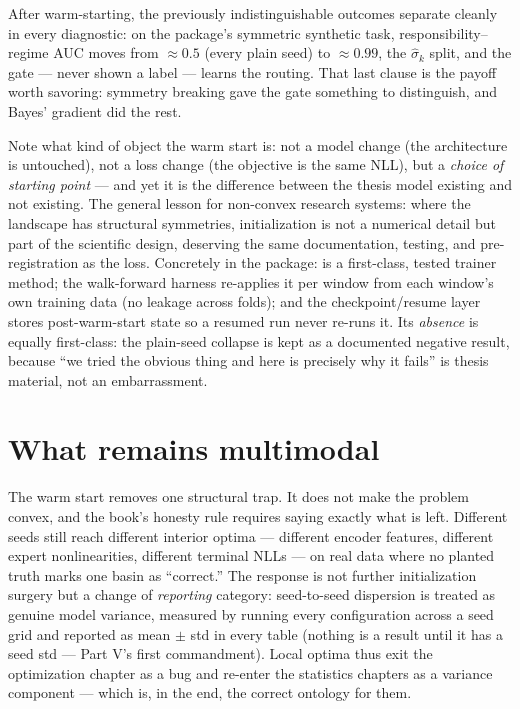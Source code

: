 After warm-starting, the previously indistinguishable outcomes separate
cleanly in every diagnostic: on the package's symmetric synthetic task,
responsibility--regime AUC moves from $\approx 0.5$ (every plain seed)
to $\approx 0.99$, the $\hat\sigma_k$ split, and the gate --- never
shown a label --- learns the routing. That last clause is the payoff
worth savoring: symmetry breaking gave the gate something to
distinguish, and Bayes' gradient did the rest.

\begin{engineering}
Note what kind of object the warm start is: not a model change (the
architecture is untouched), not a loss change (the objective is the
same NLL), but a \emph{choice of starting point} --- and yet it is the
difference between the thesis model existing and not existing. The
general lesson for non-convex research systems: where the landscape has
structural symmetries, initialization is not a numerical detail but
part of the scientific design, deserving the same documentation,
testing, and pre-registration as the loss. Concretely in the package:
 is a first-class, tested trainer method; the
walk-forward harness re-applies it per window from each window's own
training data (no leakage across folds); and the checkpoint/resume
layer stores post-warm-start state so a resumed run never re-runs it.
Its \emph{absence} is equally first-class: the plain-seed collapse is
kept as a documented negative result, because ``we tried the obvious
thing and here is precisely why it fails'' is thesis material, not an
embarrassment.
\end{engineering}

\section{What remains multimodal}\label{sec:remains}

The warm start removes one structural trap. It does not make the
problem convex, and the book's honesty rule requires saying exactly
what is left. Different seeds still reach different interior optima ---
different encoder features, different expert nonlinearities, different
terminal NLLs --- on real data where no planted truth marks one basin
as ``correct.'' The response is not further initialization surgery but
a change of \emph{reporting} category: seed-to-seed dispersion is
treated as genuine model variance, measured by running every
configuration across a seed grid and reported as mean $\pm$ std in
every table (nothing is a result until it has a seed std --- Part V's
first commandment). Local optima thus exit the optimization chapter as
a bug and re-enter the statistics chapters as a variance component ---
which is, in the end, the correct ontology for them.

